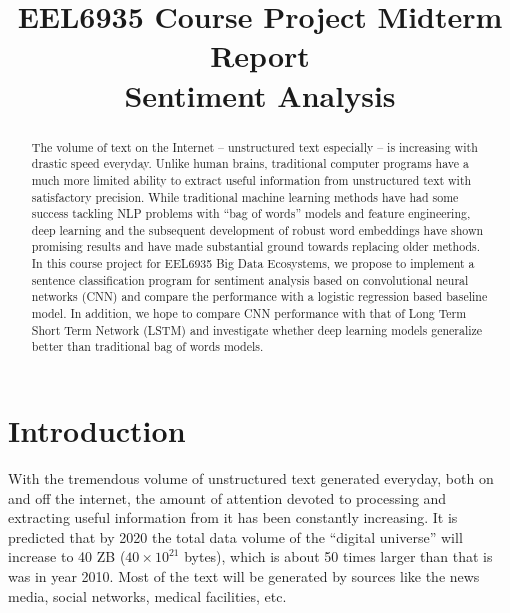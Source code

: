 \documentclass[conference]{IEEEtran}
\begin{document}
\renewcommand{\figureautorefname}{Fig.}
\newcommand{\subfigureautorefname}{Fig.}
\renewcommand{\sectionautorefname}{Section}
\renewcommand{\subsectionautorefname}{Section}


\title{EEL6935 Course Project Midterm Report \\
    Sentiment Analysis}
\author{
}

\maketitle

\begin{abstract}
    The volume of text on the Internet -- unstructured text especially --
    is increasing with drastic speed everyday. Unlike human brains, traditional 
    computer programs have a much more limited ability to extract useful
    information from unstructured text with satisfactory precision.
    While traditional machine learning methods have had some success
    tackling NLP problems with ``bag of words'' models and feature engineering,
    deep learning and the subsequent development of robust word embeddings have shown
    promising results and have made substantial ground towards replacing older methods.
    In this course project for EEL6935 Big Data Ecosystems, we propose to implement a sentence 
    classification program for sentiment analysis based on convolutional neural networks (CNN) and 
    compare the performance with a logistic regression based baseline model. In addition,
    we hope to compare CNN performance with that of Long Term Short Term Network (LSTM)
    and investigate whether deep learning models generalize better than traditional
    bag of words models.
    
\end{abstract}

\IEEEpeerreviewmaketitle

\section{Introduction}
\label{intro}
    With the tremendous volume of unstructured text generated everyday, both on and off
    the internet, the amount of attention devoted to processing and extracting useful information
    from it has been constantly increasing. It is predicted that by 2020 the
    total data volume of the ``digital universe'' will increase to 40 ZB
    ($40\times 10^{21}$ bytes), which is about 50 times larger than that is was in
    year 2010\cite{gantz2012digital}. Most of the text will be generated by
    sources like the news media, social networks, medical facilities, etc.
\end{document}
